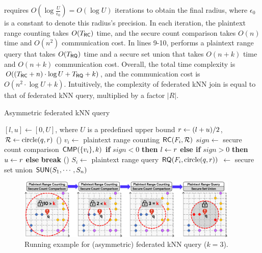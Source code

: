  requires $O(\log \frac{U}{\epsilon_0}) = O(\log{U})$ iterations to obtain the final radius, where $\epsilon_0$ is a constant to denote this radius's precision.
In each iteration, the plaintext range counting takes $O(T_{\textsf{RC}})$ time, and the secure count comparison takes $O(n)$ time and $O(n^2)$ communication cost.
In lines 9-10,  performs a plaintext range query that takes $O(T_{\textsf{RQ}})$ time and a secure set union that takes $O(n+k)$ time and $O(n+k)$ communication cost.
Overall, the total time complexity is $O((T_{\textsf{RC}}+n)\cdot\log{U} + T_{\textsf{RQ}} + k)$, and the communication cost is $O(n^2\cdot\log{U} + k)$.
Intuitively, the complexity of federated kNN join is equal to that of federated kNN query, multiplied by a factor $|R|$.

\setlength{\textfloatsep}{1ex}
\setlength{\floatsep}{1ex}
\begin{algorithm}[t]
	\caption{\small{Asymmetric federated kNN query}}\label{alg:knn}
    $[l,u] \gets [0,U]$, where $U$ is a predefined upper bound\;
     {
        $r \leftarrow (l+u)/2$, $\mathcal{R} \gets \text{circle}(q, r)$\;
        \ForEach(){}{
            $v_i \gets$ plaintext range counting $\textsf{RC}(F_i, \mathcal{R})$\; 
        } 
        $sign \gets$ secure count comparison $\textsf{CMP}(\{v_i\}, k)$\;
        \textbf{if} $sign < 0$ \textbf{then} $l \leftarrow r$\;
        \textbf{else if} $sign > 0$ \textbf{then} $u \leftarrow r$\;
        \textbf{else} \textbf{break}\;
    }
    \ForEach(){}{
        $S_i \gets$ plaintext range query $\textsf{RQ}(F_i, \text{circle}(q, r))$\;
    }
     $\gets$ secure set union $\textsf{SUN}(S_1,\cdots,S_n)$\;
\end{algorithm}
\afterpage{\global\setlength{\textfloatsep}{\oldtextfloatsep}}
\afterpage{\global\setlength{\floatsep}{\oldfloatsep}}

\begin{figure}[t]
    \centering
    \includegraphics[width=0.94\textwidth]{fed-knn-example.pdf}
	\caption{Running example for (asymmetric) federated kNN query ($k=3$).}
	\label{fig:knn}
\end{figure}

